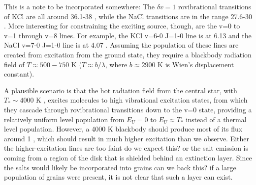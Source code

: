 \documentclass[twocolumn]{aastex62}
\begin{document}

{\color{red} This is a note to be incorporated somewhere:}
The $\delta v=1$ rovibrational transitions of KCl are all around 36.1-38 \um,
while the NaCl transitions are in the range 27.6-30 \um.
More interesting for constraining the exciting source, though, are the v=0 to
v=1 through v=8 lines.
For example, the KCl v=6-0 J=1-0 line is at 6.13 \um and the NaCl v=7-0 J=1-0
line is at 4.07 \um.  Assuming the population of these lines are created
from excitation from the ground state, they require a blackbody radiation field
of $T\approx500-750$ K ($T\approx b / \lambda$, where $b\approx2900$ \um K is
Wien's displacement constant).


A plausible scenario is that the hot radiation field from the central star,
with $T_*\sim4000$ K \citep{Testi2010a}, excites molecules to high vibrational
excitation states, from which they cascade through rovibrational transitions
down to the v=0 state, providing a relatively uniform level population
from $E_U=0$ to $E_U\approx T_*$ instead of a thermal level population.
However, a 4000 K blackbody should produce most of its flux around 1 \um,
which should result in much higher excitation than we observe.  Either
the higher-excitation lines are too faint {\color{red} do we expect this?}
or the salt emission is coming from a region of the disk that is shielded
behind an extinction layer.   Since the salts would likely be incorporated into
grains {\color{red}can we back this?} if a large population of grains
were present, it is not clear that such a layer can exist.


%
\end{document}

